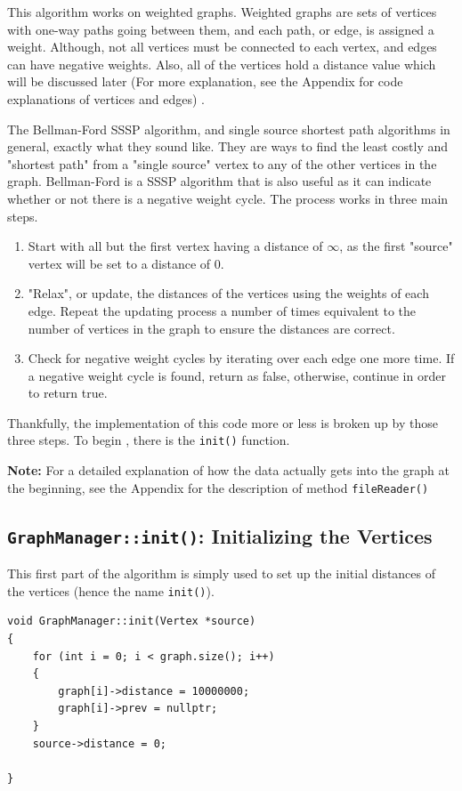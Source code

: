 \documentclass[letterpaper, 10pt]{article}
\begin{document}
This algorithm works on weighted graphs. Weighted graphs are sets of vertices with one-way paths going between them, and each path, or edge, is assigned a weight. Although, not all vertices must be connected to each vertex, and edges can have negative weights. Also, all of the vertices hold a distance value which will be discussed later (For more explanation, see the Appendix for code explanations of vertices and edges) .

The Bellman-Ford SSSP algorithm, and single source shortest path algorithms in general, exactly what they sound like. They are ways to find the least costly and "shortest path" from a "single source" vertex to any of the other vertices in the graph. Bellman-Ford is a SSSP algorithm that is also useful as it can indicate whether or not there is a negative weight cycle. The process works in three main steps.
\begin{enumerate}
    \item Start with all but the first vertex having a distance of $\infty$, as the first "source" vertex will be set to a distance of 0.
    \item "Relax", or update, the distances of the vertices using the weights of each edge. Repeat the updating process a number of times equivalent to the number of vertices in the graph to ensure the distances are correct.
    \item Check for negative weight cycles by iterating over each edge one more time. If a negative weight cycle is found, return as false, otherwise, continue in order to return true.
\end{enumerate}

Thankfully, the implementation of this code more or less is broken up by those three steps. To begin , there is the \texttt{init()} function.
\vspace{.5em}

\textbf{Note:} For a detailed explanation of how the data actually gets into the graph at the beginning, see the Appendix for the description of method \texttt{fileReader()}


\subsection{\texttt{GraphManager::init()}: Initializing the Vertices}

This first part of the algorithm is simply used to set up the initial distances of the vertices (hence the name \texttt{init()}).


 \begin{addmargin}[-5em]{1em}
\begin{small}
\begin{verbatim}
void GraphManager::init(Vertex *source)
{
	for (int i = 0; i < graph.size(); i++)
	{
		graph[i]->distance = 10000000;
		graph[i]->prev = nullptr;
	}
	source->distance = 0;

}
\end{verbatim}
\end{small}
\end{addmargin}
\end{document}
